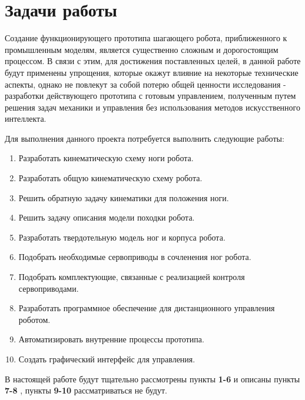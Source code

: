 \section{Задачи работы}\label{C1_1}

Создание функционирующего прототипа шагающего робота, приближенного к промышленным моделям, является существенно сложным и дорогостоящим процессом. В связи с этим, для достижения поставленных целей, в данной работе будут применены упрощения, которые окажут влияние на некоторые технические аспекты, однако не повлекут за собой потерю общей ценности исследования - разработки действующего прототипа с готовым управлением, полученным путем решения задач механики и управления без использования методов искусственного интеллекта.


 
Для выполнения данного проекта потребуется выполнить следующие работы:
\begin{enumerate}
	\item Разработать кинематическую схему ноги робота.
	\item Разработать общую кинематическую схему робота.
	\item Решить обратную задачу кинематики для положения ноги.
	\item Решить задачу описания модели походки робота.
	\item Разработать твердотельную модель ног и корпуса робота.
	\item Подобрать необходимые сервоприводы в сочленения ног робота.
	\item Подобрать комплектующие, связанные с реализацией контроля сервоприводами.
	\item Разработать программное обеспечение для дистанционного управления роботом.
	\item Автоматизировать внутренние процессы прототипа. 
	\item Создать графический интерфейс для управления.
\end{enumerate}
В настоящей работе будут тщательно рассмотрены пункты \textbf{1-6} и описаны пункты \textbf{7-8} , пункты \textbf{9-10} рассматриваться не будут.

